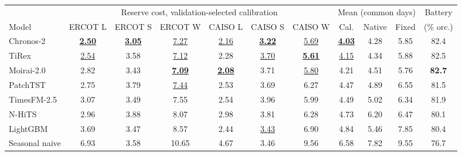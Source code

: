 \begin{tabular}{lcccccccccc}
\toprule
 & \multicolumn{6}{c}{Reserve cost, validation-selected calibration} & \multicolumn{3}{c}{Mean (common days)} & Battery \\
\cmidrule(lr){2-7}\cmidrule(lr){8-10}
Model & ERCOT L & ERCOT S & ERCOT W & CAISO L & CAISO S & CAISO W & Cal. & Native & Fixed & (\% orc.) \\
\midrule
Chronos-2 & \underline{\textbf{2.50}} & \underline{\textbf{3.05}} & \underline{7.27} & \underline{2.16} & \underline{\textbf{3.22}} & \underline{5.69} & \underline{\textbf{4.03}} & 4.28 & 5.85 & 82.4 \\
TiRex & \underline{2.54} & 3.58 & \underline{7.12} & 2.28 & \underline{3.70} & \underline{\textbf{5.61}} & \underline{4.15} & 4.34 & 5.88 & 82.5 \\
Moirai-2.0 & 2.82 & 3.43 & \underline{\textbf{7.09}} & \underline{\textbf{2.08}} & 3.71 & \underline{5.80} & 4.21 & 4.51 & 5.76 & \textbf{82.7} \\
PatchTST & 2.75 & 3.79 & \underline{7.44} & 2.53 & 3.69 & 6.27 & 4.47 & 4.89 & 6.55 & 81.5 \\
TimesFM-2.5 & 3.07 & 3.49 & 7.55 & 2.54 & 3.96 & 5.99 & 4.49 & 5.02 & 6.34 & 81.9 \\
N-HiTS & 2.96 & 3.88 & 8.07 & 2.98 & 3.81 & 6.28 & 4.73 & 6.20 & 6.47 & 80.1 \\
LightGBM & 3.69 & 3.47 & 8.57 & 2.44 & \underline{3.43} & 6.90 & 4.84 & 5.46 & 7.85 & 80.4 \\
Seasonal naive & 6.93 & 3.58 & 10.65 & 4.67 & 3.46 & 9.56 & 6.58 & 7.82 & 9.55 & 76.7 \\
\bottomrule
\end{tabular}
